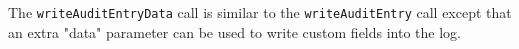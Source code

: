 The \verb+writeAuditEntryData+ call is similar to the \verb+writeAuditEntry+ call except that an extra "data"
parameter can be used to write custom fields into the log.
